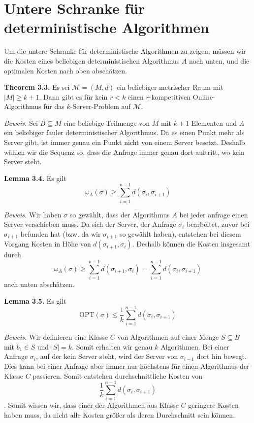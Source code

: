 \section{Untere Schranke für deterministische Algorithmen}

Um die untere Schranke für deterministische Algorithmen zu zeigen, müssen wir die Kosten eines beliebigen deterministischen Algorithmus $A$ nach unten, und die optimalen Kosten nach oben abschätzen.

\textbf{Theorem 3.3.} Es sei $\mathcal{M} = (M,d)$ ein beliebiger metrischer Raum mit $|M| \geq k+1$. Dann gibt es für kein $r < k$ einen $r$-kompetitiven Online-Algorithmus für das $k$-Server-Problem auf $\mathcal{M}$.

\textit{Beweis.} Sei $B \subseteq M$ eine beliebige Teilmenge von $M$ mit $k+1$ Elementen und $A$ ein beliebiger fauler deterministischer Algorithmus. Da es einen Punkt mehr als Server gibt, ist immer genau ein Punkt nicht von einem Server besetzt. Deshalb wählen wir die Sequenz so, dass die Anfrage immer genau dort auftritt, wo kein Server steht.


\textbf{Lemma 3.4.} Es gilt $$\omega_A(\sigma) \geq \sum_{i=1}^{n-1}d(\sigma_i,\sigma_{i+1})$$

\textit{Beweis.} Wir haben $\sigma$ so gewählt, dass der Algorithmus $A$ bei jeder anfrage einen Server verschieben muss. Da sich der Server, der Anfrage $\sigma_i$ bearbeitet, zuvor bei $\sigma_{i+1}$ befunden hat (bzw. da wir $\sigma_{i+1}$ so gewählt haben), entstehen bei diesem Vorgang Kosten in Höhe von $d(\sigma_{i+1},\sigma_i)$. Deshalb können die Kosten insgesamt durch $$\omega_A(\sigma) \geq \sum_{i=1}^{n-1}d(\sigma_{i+1},\sigma_i) = \sum_{i=1}^{n-1}d(\sigma_i,\sigma_{i+1})$$ nach unten abschätzen.


\textbf{Lemma 3.5.} Es gilt $$\textrm{OPT}(\sigma) \leq \frac{1}{k}\sum_{i=1}^{n-1}d(\sigma_i,\sigma_{i+1})$$

\textit{Beweis.} Wir definieren eine Klasse $C$ von Algorithmen auf einer Menge $S \subseteq B$ mit $b_1 \in S$ und $|S|=k$. Somit erhalten wir genau $k$ Algorithmen. Bei einer Anfrage $\sigma_i$, auf der kein Server steht, wird der Server von $\sigma_{i-1}$ dort hin bewegt. Dies kann bei einer Anfrage aber immer nur höchstens für einen Algorithmus der Klasse $C$ passieren. Somit entstehen durchschnittliche Kosten von $$\frac{1}{k}\sum_{i=1}^{n-1}d(\sigma_i,\sigma_{i+1})$$. Somit wissen wir, dass einer der Algorithmen aus Klasse $C$ geringere Kosten haben muss, da nicht alle Kosten größer als deren Durchschnitt sein können.


